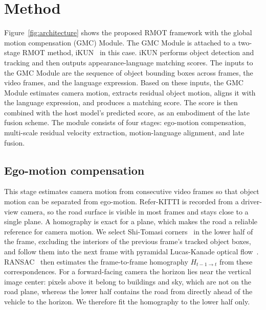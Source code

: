 \documentclass{article}
\begin{document}



\section{Method}
\label{sec:method}
Figure~\ref{fig:architecture} shows the proposed RMOT framework with the global motion compensation (GMC) Module. The GMC Module is attached to a two-stage RMOT method, iKUN~\cite{ikun} in this case. iKUN performs object detection and tracking and then outputs appearance-language matching scores. The inputs to the GMC Module are the sequence of object bounding boxes across frames, the video frames, and the language expression. Based on these inputs, the GMC Module estimates camera motion, extracts residual object motion, aligns it with the language expression, and produces a matching score. The score is then combined with the host model's predicted score, as an embodiment of the late fusion scheme. The module consists of four stages: ego-motion compensation, multi-scale residual velocity extraction, motion-language alignment, and late fusion.


\subsection{Ego-motion compensation}
\label{sec:ego}
This stage estimates camera motion from consecutive video frames so that object motion can be separated from ego-motion. Refer-KITTI is recorded from a driver-view camera, so the road surface is visible in most frames and stays close to a single plane. A homography is exact for a plane, which makes the road a reliable reference for camera motion. We select Shi-Tomasi corners~\cite{shitomasi} in the lower half of the frame, excluding the interiors of the previous frame's tracked object boxes, and follow them into the next frame with pyramidal Lucas-Kanade optical flow~\cite{lucaskanade}. RANSAC~\cite{ransac} then estimates the frame-to-frame homography $H_{t-1 \to t}$ from these correspondences. For a forward-facing camera the horizon lies near the vertical image center: pixels above it belong to buildings and sky, which are not on the road plane, whereas the lower half contains the road from directly ahead of the vehicle to the horizon. We therefore fit the homography to the lower half only.
\end{document}
